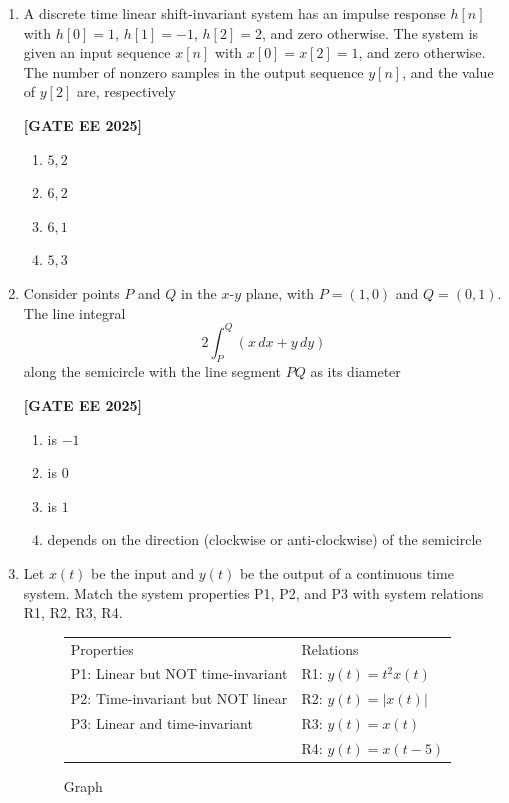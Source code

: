 \documentclass[12pt]{article}
\begin{document}
\begin{enumerate}[leftmargin=*, label=\textbf{Q.\arabic*:}]
\item A discrete time linear shift-invariant system has an impulse response $h[n]$ with $h[0]=1$, $h[1]=-1$, $h[2]=2$, and zero otherwise. The system is given an input sequence $x[n]$ with $x[0]=x[2]=1$, and zero otherwise. The number of nonzero samples in the output sequence $y[n]$, and the value of $y[2]$ are, respectively
 
\noindent \textbf{[GATE EE 2025]}

\begin{multicols}{4}
\begin{enumerate}
    \item $5, 2$
    \item $6, 2$
    \item $6, 1$
    \item $5, 3$
\end{enumerate}
\end{multicols}

\item Consider points $P$ and $Q$ in the $x$-$y$ plane, with $P = (1,0)$ and $Q = (0,1)$. The line integral
\[
2\int_P^Q (x\,dx + y\,dy)
\]
along the semicircle with the line segment $PQ$ as its diameter
 
\noindent \textbf{[GATE EE 2025]}
\begin{enumerate}
  \item is $-1$
  \item is $0$
  \item is $1$
  \item depends on the direction (clockwise or anti-clockwise) of the semicircle
\end{enumerate}

\item Let $x(t)$ be the input and $y(t)$ be the output of a continuous time system. Match the system properties P1, P2, and P3 with system relations R1, R2, R3, R4.
\begin{figure}[H]\centering
  \begin{tabular}{ll}
    Properties & Relations \\
    P1: Linear but NOT time-invariant              & R1: $y(t)=t^2 x(t) $ \\
    P2: Time-invariant but NOT linear              & R2: $y(t)=|x(t)| $ \\
    P3: Linear and time-invariant                  & R3: $y(t)=x(t)$ \\
                                                  & R4: $y(t)=x(t-5)$
  \end{tabular}
\caption{Graph}
\label{fig:q11}
\end{figure}
 

\end{enumerate}
\end{document}
